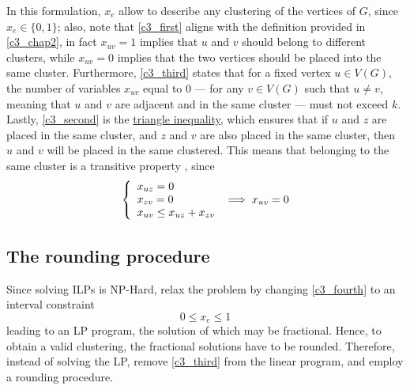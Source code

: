 In this formulation, $x_e$ allow to describe any clustering of the vertices of $G$, since $x_e \in \{0, 1\}$; also, note that \cref{c3_first} aligns with the definition provided in \cref{c3_chap2}, in fact $x_{uv} = 1$ implies that $u$ and $v$ should belong to different clusters, while $x_{uv} = 0$ implies that the two vertices should be placed into the same cluster. Furthermore, \cref{c3_third} states that for a fixed vertex $u \in V(G)$, the number of variables $x_{uv}$ equal to 0 --- for any $v \in V(G)$ such that $u \neq v$, meaning that $u$ and $v$ are adjacent and in the same cluster --- must not exceed $k$. Lastly, \cref{c3_second} is the \href{https://en.wikipedia.org/wiki/Triangle_inequality}{triangle inequality}, which ensures that if $u$ and $z$ are placed in the same cluster, and $z$ and $v$ are also placed in the same cluster, then $u$ and $v$ will be placed in the same clustered. This means that belonging to the same cluster is a transitive property , since $$\soe{l}{x_{uz} = 0 \\ x_{zv} = 0 \\ x_{uv} \le x_{uz} + x_{zv}} \implies x_{uv} = 0$$

\subsection{The rounding procedure}

Since solving ILPs is NP-Hard, \textcite{c3} relax the problem by changing \cref{c3_fourth} to an interval constraint $$0 \le x_e \le 1$$ leading to an LP program, the solution of which may be fractional. Hence, to obtain a valid clustering, the fractional solutions have to be rounded. Therefore, instead of solving the LP, \textcite{c3} remove \cref{c3_third} from the linear program, and employ a rounding procedure.

